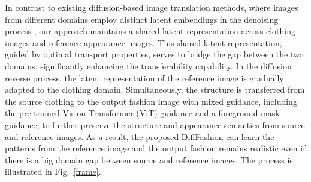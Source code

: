 In contrast to existing diffusion-based image translation methods, where images from different domains employ distinct latent embeddings in the denoising process \cite{kwon2022diffusion}, our approach maintains a shared latent representation across clothing images and reference appearance images. This shared latent representation, guided by optimal transport properties, serves to bridge the gap between the two domains, significantly enhancing the transferability capability. In the diffusion reverse process, the latent representation of the reference image is gradually adapted to the clothing domain. 
Simultaneously, the structure is transferred from the source clothing to the output fashion image with mixed guidance, including the pre-trained Vision Transformer (ViT) guidance and a foreground mask guidance, to further preserve the structure and appearance semantics from source and reference images.
As a result, the proposed DiffFashion can learn the patterns from the reference image and the output fashion remains realistic even if there is a big domain gap between source and reference images.
The process is illustrated in Fig.~\ref{frame}.

